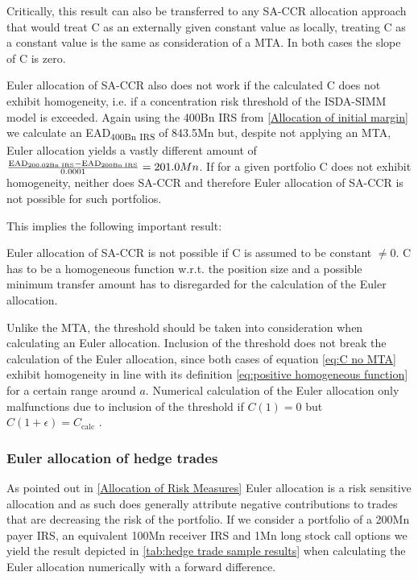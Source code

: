 \documentclass[../Thesis_AHoecherl.tex]{subfiles}
\begin{document}
    Critically, this result can also be transferred to any SA-CCR allocation approach that would treat C as an externally given constant value as locally, treating C as a constant value is the same as consideration of a \gls{MTA}. 
    In both cases the slope of C is zero. 
    
    Euler allocation of SA-CCR also does not work if the calculated C does not exhibit homogeneity, i.e. if a concentration risk threshold of the ISDA-SIMM model is exceeded. Again using the 400Bn IRS from \ref{Allocation of initial margin} we calculate an EAD\textsubscript{400Bn IRS} of 843.5Mn but, despite not applying an MTA, Euler allocation yields a vastly different amount of $ \frac{\text{EAD\textsubscript{200.02Bn IRS}}-\text{EAD\textsubscript{200Bn IRS}}}{0.0001} = 201.0Mn $. If for a given portfolio C does not exhibit homogeneity, neither does SA-CCR and therefore Euler allocation of SA-CCR is not possible for such portfolios.

    This implies the following important result:
    
    Euler allocation of SA-CCR is not possible if C is assumed to be constant $\neq 0$. C has to be a homogeneous function w.r.t. the position size and a possible minimum transfer amount has to disregarded for the calculation of the Euler allocation.

    Unlike the \gls{MTA}, the threshold should be taken into consideration when calculating an Euler allocation. 
    Inclusion of the threshold does not break the calculation of the Euler allocation, since both cases of equation \ref{eq:C no MTA} exhibit homogeneity in line with its definition \ref{eq:positive homogeneous function} for a certain range around $a$. 
    Numerical calculation of the Euler allocation only malfunctions due to inclusion of the threshold if $C(1) = 0$ but $C(1+\epsilon) = C_{\text{calc}}$ .

    \subsubsection{Euler allocation of hedge trades}

    As pointed out in \ref{Allocation of Risk Measures} Euler allocation is a risk sensitive allocation and as such does generally attribute negative contributions to trades that are decreasing the risk of the portfolio. If we consider a portfolio of a 200Mn payer IRS, an equivalent 100Mn receiver IRS and 1Mn long stock call options we yield the result depicted in \ref{tab:hedge trade sample results} when calculating the Euler allocation numerically with a forward difference.
\end{document}
